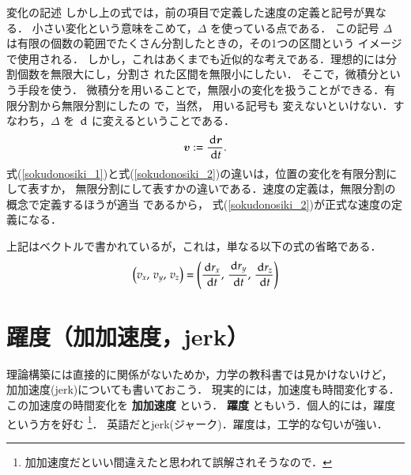 \begin{memo}{変化の記述}
                しかし上の式では，前の項目で定義した速度の定義と記号が異なる．
                小さい変化という意味をこめて，$\Delta$ を使っている点である．
                この記号 $\Delta$ は有限の個数の範囲でたくさん分割したときの，その1つの区間という
                イメージで使用される．
                しかし，これはあくまでも近似的な考えである．理想的には分割個数を無限大にし，分割さ
                れた区間を無限小にしたい．
                そこで，微積分という手段を使う．
                微積分を用いることで，無限小の変化を扱うことができる．有限分割から無限分割にしたの
                で，当然，
                用いる記号も
                変えないといけない．すなわち，$\Delta$ を $\,\mathrm{d}$ に変えるということである．
                    \begin{align}\label{sokudonosiki_2}
                        \bv := \frac{\df \br}{\df t}.
                    \end{align}
                式(\ref{sokudonosiki_1})と式(\ref{sokudonosiki_2})の違いは，位置の変化を有限分割に
                して表すか，
                無限分割にして表すかの違いである．速度の定義は，無限分割の概念で定義するほうが適当
                であるから，
                式(\ref{sokudonosiki_2})が正式な速度の定義になる．

                上記はベクトルで書かれているが，これは，単なる以下の式の省略である．
                        \begin{align}
                            \left(
                                v_{x} ,\,
                                v_{y} ,\,
                                v_{z}
                            \right)
                            = \left(
                                \frac{\,\mathrm{d} {r}_{x}}{\,\mathrm{d} t} ,\,
                                \frac{\,\mathrm{d} {r}_{y}}{\,\mathrm{d} t} ,\,
                                \frac{\,\mathrm{d} {r}_{z}}{\,\mathrm{d} t}
                              \right)
                        \end{align}
            \end{memo}


    \section{躍度（加加速度，jerk）}\label{seq:jerk_define}
        理論構築には直接的に関係がないためか，力学の教科書では見かけないけど，
        加加速度(jerk)についても書いておこう．
        現実的には，加速度も時間変化する．この加速度の時間変化を \textbf{加加速度} という．
        \textbf{躍度} ともいう．個人的には，躍度という方を好む
            \footnote{
                加加速度だといい間違えたと思われて誤解されそうなので．
            }．
        英語だとjerk(ジャーク)．躍度は，工学的な匂いが強い．

